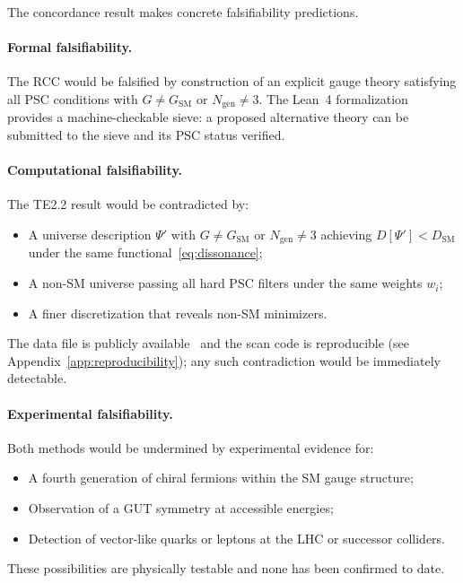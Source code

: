 \documentclass[11pt,twocolumn]{article}
\theoremstyle{remark}
\begin{document}
The concordance result makes concrete falsifiability predictions.

\paragraph{Formal falsifiability.}
The RCC would be falsified by construction of an explicit gauge
theory satisfying all PSC conditions with $G\neq G_{\mathrm{SM}}$
or $N_{\mathrm{gen}}\neq 3$.
The Lean~4 formalization~\cite{SpivackUGPFormalization} provides a
machine-checkable sieve: a proposed alternative theory can be
submitted to the sieve and its PSC status verified.

\paragraph{Computational falsifiability.}
The TE2.2 result would be contradicted by:
\begin{itemize}
  \item A universe description $\Psi'$ with $G\neq G_{\mathrm{SM}}$
        or $N_{\mathrm{gen}}\neq 3$ achieving $D[\Psi']<D_{\mathrm{SM}}$
        under the same functional~\eqref{eq:dissonance};
  \item A non-SM universe passing all hard PSC filters under
        the same weights $w_i$;
  \item A finer discretization that reveals non-SM minimizers.
\end{itemize}
The data file is publicly available~\cite{ugp-physics-repo} and the
scan code is reproducible (see Appendix~\ref{app:reproducibility});
any such contradiction would be immediately detectable.

\paragraph{Experimental falsifiability.}
Both methods would be undermined by experimental evidence for:
\begin{itemize}
  \item A fourth generation of chiral fermions within the SM
        gauge structure;
  \item Observation of a GUT symmetry at accessible energies;
  \item Detection of vector-like quarks or leptons at the LHC or
        successor colliders.
\end{itemize}
These possibilities are physically testable and none has been
confirmed to date.
\end{document}
